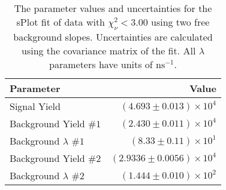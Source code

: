 
\begin{table}[ht]
    \begin{center}
        \begin{tabular}{lr}\toprule
            Parameter & Value \\\midrule
            Signal Yield & $(4.693 \pm 0.013) \times 10^{4}$ \\
            Background Yield $\#1$ & $(2.430 \pm 0.011) \times 10^{4}$ \\
            Background $\lambda$ $\#1$ & $(8.33 \pm 0.11) \times 10^{1}$ \\
            Background Yield $\#2$ & $(2.9336 \pm 0.0056) \times 10^{4}$ \\
            Background $\lambda$ $\#2$ & $(1.444 \pm 0.010) \times 10^{2}$ \\\bottomrule
        \end{tabular}
        \caption{The parameter values and uncertainties for the sPlot fit of data with $\chi^2_\nu < 3.00$ using two free background slopes. Uncertainties are calculated using the covariance matrix of the fit. All $\lambda$ parameters have units of $\si{\nano\second}^{-1}$.}\label{tab:splot-fit-results-chisqdof-3.00-free-2}
    \end{center}
\end{table}
